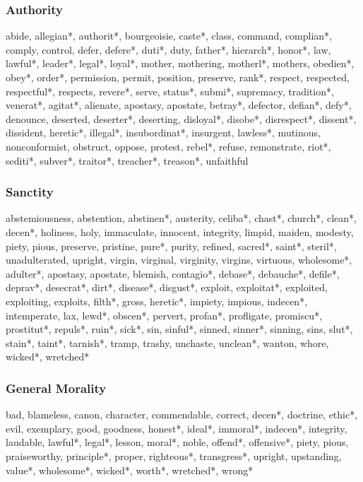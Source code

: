 \subsubsection*{Authority} abide, allegian*, authorit*, bourgeoisie, caste*, class, command, complian*, comply, control, defer, defere*, duti*, duty, father*, hierarch*, honor*, law, lawful*, leader*, legal*, loyal*, mother, mothering, motherl*, mothers, obedien*, obey*, order*, permission, permit, position, preserve, rank*, respect, respected, respectful*, respects, revere*, serve, status*, submi*, supremacy, tradition*, venerat*, agitat*, alienate, apostasy, apostate, betray*, defector, defian*, defy*, denounce, deserted, deserter*, deserting, disloyal*, disobe*, disrespect*, dissent*, dissident, heretic*, illegal*, insubordinat*, insurgent, lawless*, mutinous, nonconformist, obstruct, oppose, protest, rebel*, refuse, remonstrate, riot*, sediti*, subver*, traitor*, treacher*, treason*, unfaithful

\subsubsection*{Sanctity} abstemiousness, abstention, abstinen*, austerity, celiba*, chast*, church*, clean*, decen*, holiness, holy, immaculate, innocent, integrity, limpid, maiden, modesty, piety, pious, preserve, pristine, pure*, purity, refined, sacred*, saint*, steril*, unadulterated, upright, virgin, virginal, virginity, virgins, virtuous, wholesome*, adulter*, apostasy, apostate, blemish, contagio*, debase*, debauche*, defile*, deprav*, desecrat*, dirt*, disease*, disgust*, exploit, exploitat*, exploited, exploiting, exploits, filth*, gross, heretic*, impiety, impious, indecen*, intemperate, lax, lewd*, obscen*, pervert, profan*, profligate, promiscu*, prostitut*, repuls*, ruin*, sick*, sin, sinful*, sinned, sinner*, sinning, sins, slut*, stain*, taint*, tarnish*, tramp, trashy, unchaste, unclean*, wanton, whore, wicked*, wretched*

\subsubsection*{General Morality} bad, blameless, canon, character, commendable, correct, decen*, doctrine, ethic*, evil, exemplary, good, goodness, honest*, ideal*, immoral*, indecen*, integrity, laudable, lawful*, legal*, lesson, moral*, noble, offend*, offensive*, piety, pious, praiseworthy, principle*, proper, righteous*, transgress*, upright, upstanding, value*, wholesome*, wicked*, worth*, wretched*, wrong*


